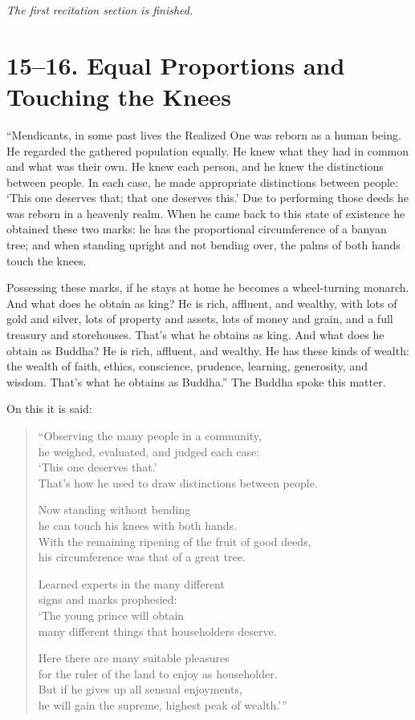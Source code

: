 \documentclass[12pt,openany]{book}%
\newcommand*{\scendsection}[1]{\begin{center}\textit{#1}\end{center}}
\begin{document}
\scendsection{The first recitation section is finished. }

\section*{15–16. Equal Proportions and Touching the Knees }

“Mendicants, in some past lives the Realized One was reborn as a human being. He regarded the gathered population equally. He knew what they had in common and what was their own. He knew each person, and he knew the distinctions between people. In each case, he made appropriate distinctions between people: ‘This one deserves that; that one deserves this.’ Due to performing those deeds he was reborn in a heavenly realm. When he came back to this state of existence he obtained these two marks: he has the proportional circumference of a banyan tree; and when standing upright and not bending over, the palms of both hands touch the knees. 

Possessing these marks, if he stays at home he becomes a wheel-turning monarch. And what does he obtain as king? He is rich, affluent, and wealthy, with lots of gold and silver, lots of property and assets, lots of money and grain, and a full treasury and storehouses. That’s what he obtains as king. And what does he obtain as Buddha? He is rich, affluent, and wealthy. He has these kinds of wealth: the wealth of faith, ethics, conscience, prudence, learning, generosity, and wisdom. That’s what he obtains as Buddha.” The Buddha spoke this matter. 

On this it is said: 

\begin{verse}%
“Observing the many people in a community, \\
he weighed, evaluated, and judged each case: \\
‘This one deserves that.’ \\
That’s how he used to draw distinctions between people. 

Now standing without bending \\
he can touch his knees with both hands. \\
With the remaining ripening of the fruit of good deeds, \\
his circumference was that of a great tree. 

Learned experts in the many different \\
signs and marks prophesied: \\
‘The young prince will obtain \\
many different things that householders deserve. 

Here there are many suitable pleasures \\
for the ruler of the land to enjoy as householder. \\
But if he gives up all sensual enjoyments, \\
he will gain the supreme, highest peak of wealth.’” 

%
\end{verse}
\end{document}
